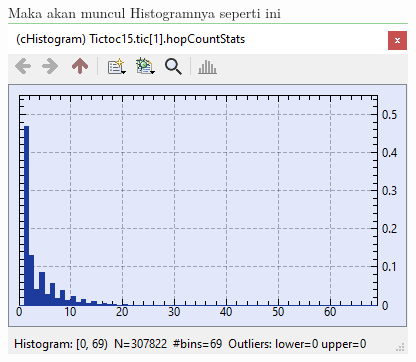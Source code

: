 \documentclass[conference]{IEEEtran}
\begin{document}
\begin{enumerate}
	      Maka akan muncul Histogramnya seperti ini\break
	      \includegraphics[scale=0.32]{images/tic[1]-histogram2.png}
\end{enumerate}
\end{document}
